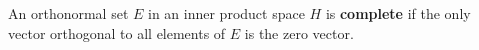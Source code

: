 An orthonormal set $E$ in an inner product space $H$ is \textbf{complete} if the only vector orthogonal to all elements of $E$ is the zero vector.
